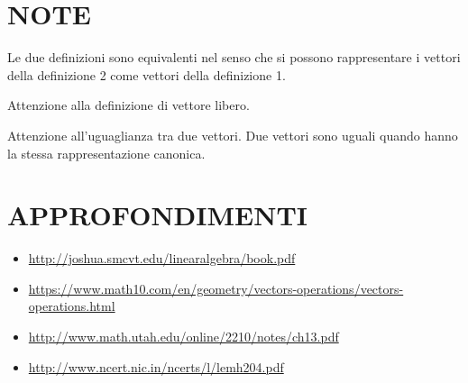 \documentclass[a4paper,10pt]{article}
\begin{document}
\section{NOTE}
Le due definizioni sono equivalenti nel senso che si possono rappresentare i vettori della definizione 2 come vettori
della definizione 1.

Attenzione alla definizione di vettore libero.

Attenzione all'uguaglianza tra due vettori. Due vettori sono uguali quando hanno la stessa rappresentazione canonica.

\section{APPROFONDIMENTI}
\begin{itemize}
 \item \url{http://joshua.smcvt.edu/linearalgebra/book.pdf}
 \item \url{https://www.math10.com/en/geometry/vectors-operations/vectors-operations.html}
 \item \url{http://www.math.utah.edu/online/2210/notes/ch13.pdf}
 \item \url{http://www.ncert.nic.in/ncerts/l/lemh204.pdf}
\end{itemize}
\end{document}
